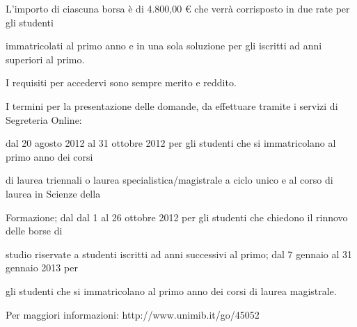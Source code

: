 L'importo di ciascuna borsa è di 4.800,00 € che verrà corrisposto in due rate per gli studenti 



immatricolati al primo anno e in una sola soluzione per gli iscritti ad anni superiori al primo. 



I requisiti per accedervi sono sempre merito e reddito.



I termini per la  presentazione delle domande, da effettuare tramite i servizi di Segreteria Online: 



dal 20 agosto 2012 al 31 ottobre 2012 per gli studenti che si immatricolano al primo anno dei corsi 



di laurea triennali o laurea specialistica/magistrale a ciclo unico e al corso di laurea in Scienze della 



Formazione; dal dal 1 al 26 ottobre 2012 per gli studenti che chiedono il rinnovo delle borse di 



studio riservate a studenti iscritti ad anni successivi al primo; dal 7 gennaio al 31 gennaio 2013 per 



gli studenti che si immatricolano al primo anno dei corsi di laurea magistrale. 



Per maggiori informazioni: http://www.unimib.it/go/45052
